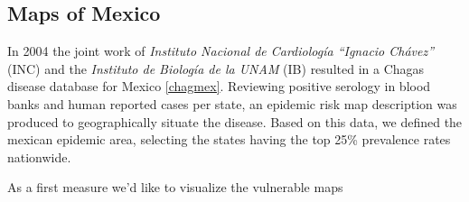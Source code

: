 \subsection{Maps of Mexico}

In 2004 the joint work of \textit{Instituto Nacional de Cardiología “Ignacio Chávez”} (INC) and the \textit{Instituto de Biología de la UNAM } (IB) resulted in a Chagas disease database for Mexico \ref{chagmex}. Reviewing positive serology in blood banks and human reported cases per state, an epidemic risk map description was produced to geographically situate the disease. Based on this data, we defined the mexican epidemic area, selecting the states having the top 25\% prevalence rates nationwide. 



As a first measure we'd like to visualize the vulnerable maps 